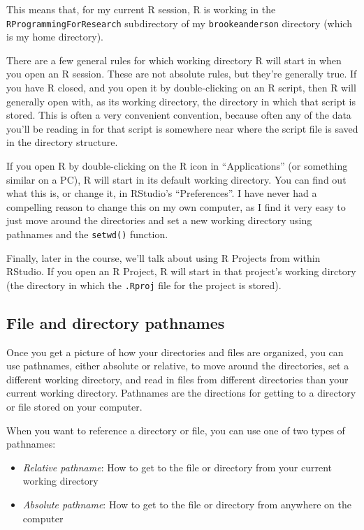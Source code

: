 \documentclass[]{book}
\providecommand{\tightlist}{%
  \setlength{\itemsep}{0pt}\setlength{\parskip}{0pt}}
\begin{document}
This means that, for my current R session, R is working in the
\texttt{RProgrammingForResearch} subdirectory of my
\texttt{brookeanderson} directory (which is my home directory).

There are a few general rules for which working directory R will start
in when you open an R session. These are not absolute rules, but they're
generally true. If you have R closed, and you open it by double-clicking
on an R script, then R will generally open with, as its working
directory, the directory in which that script is stored. This is often a
very convenient convention, because often any of the data you'll be
reading in for that script is somewhere near where the script file is
saved in the directory structure.

If you open R by double-clicking on the R icon in ``Applications'' (or
something similar on a PC), R will start in its default working
directory. You can find out what this is, or change it, in RStudio's
``Preferences''. I have never had a compelling reason to change this on
my own computer, as I find it very easy to just move around the
directories and set a new working directory using pathnames and the
\texttt{setwd()} function.

Finally, later in the course, we'll talk about using R Projects from
within RStudio. If you open an R Project, R will start in that project's
working dirctory (the directory in which the \texttt{.Rproj} file for
the project is stored).

\subsection{File and directory
pathnames}\label{file-and-directory-pathnames}

Once you get a picture of how your directories and files are organized,
you can use pathnames, either absolute or relative, to move around the
directories, set a different working directory, and read in files from
different directories than your current working directory. Pathnames are
the directions for getting to a directory or file stored on your
computer.

When you want to reference a directory or file, you can use one of two
types of pathnames:

\begin{itemize}
\tightlist
\item
  \emph{Relative pathname}: How to get to the file or directory from
  your current working directory
\item
  \emph{Absolute pathname}: How to get to the file or directory from
  anywhere on the computer
\end{itemize}
\end{document}

